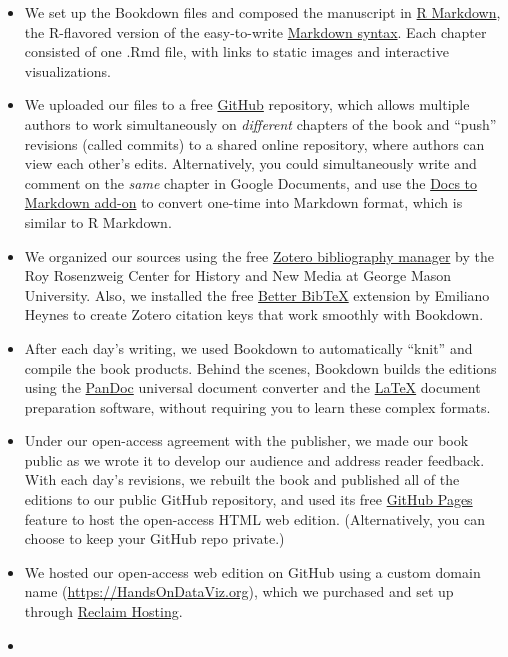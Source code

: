 \documentclass[
  english,
]{book}
\providecommand{\tightlist}{%
  \setlength{\itemsep}{0pt}\setlength{\parskip}{0pt}}
\begin{document}
\begin{itemize}
\tightlist
\item
  We set up the Bookdown files and composed the manuscript in \href{https://rmarkdown.rstudio.com}{R Markdown}, the R-flavored version of the easy-to-write \href{https://en.wikipedia.org/wiki/Markdown}{Markdown syntax}. Each chapter consisted of one .Rmd file, with links to static images and interactive visualizations.
\item
  We uploaded our files to a free \href{https://github.com}{GitHub} repository, which allows multiple authors to work simultaneously on \emph{different} chapters of the book and ``push'' revisions (called commits) to a shared online repository, where authors can view each other's edits. Alternatively, you could simultaneously write and comment on the \emph{same} chapter in Google Documents, and use the \href{https://github.com/evbacher/gd2md-html/wiki}{Docs to Markdown add-on} to convert one-time into Markdown format, which is similar to R Markdown.
\item
  We organized our sources using the free \href{https://zotero.org}{Zotero bibliography manager} by the Roy Rosenzweig Center for History and New Media at George Mason University. Also, we installed the free \href{https://github.com/retorquere/zotero-better-bibtex}{Better BibTeX} extension by Emiliano Heynes to create Zotero citation keys that work smoothly with Bookdown.
\item
  After each day's writing, we used Bookdown to automatically ``knit'' and compile the book products. Behind the scenes, Bookdown builds the editions using the \href{https://pandoc.org/}{PanDoc} universal document converter and the \href{https://www.latex-project.org}{LaTeX} document preparation software, without requiring you to learn these complex formats.
\item
  Under our open-access agreement with the publisher, we made our book public as we wrote it to develop our audience and address reader feedback. With each day's revisions, we rebuilt the book and published all of the editions to our public GitHub repository, and used its free \href{https://pages.github.com}{GitHub Pages} feature to host the open-access HTML web edition. (Alternatively, you can choose to keep your GitHub repo private.)
\item
  We hosted our open-access web edition on GitHub using a custom domain name (\url{https://HandsOnDataViz.org}), which we purchased and set up through \href{https://reclaimhosting.com}{Reclaim Hosting}.
\item

\end{itemize}
\end{document}
